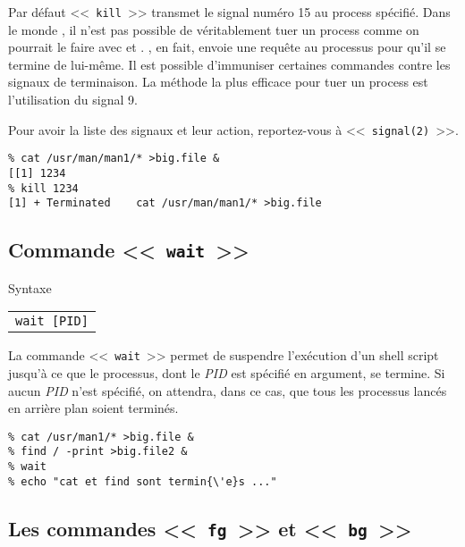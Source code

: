 Par d{\'e}faut <<~{\tt kill}~>> transmet le signal num{\'e}ro 15 au process sp{\'e}cifi{\'e}.
Dans le monde {\Unix}, il n'est pas possible de v{\'e}ritablement tuer un process comme on pourrait le faire avec {\WindowsNT} et {\OpenVMS}. {\Unix}, en fait, envoie une requ{\^e}te au processus pour qu'il se termine de lui-m{\^e}me. Il est possible d'immuniser certaines commandes contre les signaux de terminaison. La
m{\'e}thode la plus efficace pour tuer un process est l'utilisation du signal 9.

Pour avoir la liste des signaux et leur action, reportez-vous {\`a} <<~{\tt signal(2)}~>>.

\begin{example}
\begin{verbatim}
% cat /usr/man/man1/* >big.file &
[[1] 1234
% kill 1234
[1] + Terminated	cat /usr/man/man1/* >big.file
\end{verbatim}
\end{example}

\subsection{Commande <<~{\tt wait}~>>}

\begin{definition}{Syntaxe}
\begin{tabular}{@{\hspace{1cm}}l}
	{\tt wait [PID]}\\[0.2cm]
\end{tabular}
\end{definition}

La commande <<~\texttt{wait}~>> permet de suspendre l'ex{\'e}cution d'un shell script jusqu'{\`a} ce que le processus, dont le \textsl{PID} est sp{\'e}cifi{\'e} en argument, se termine. Si aucun \textsl{PID} n'est sp{\'e}cifi{\'e}, on attendra, dans ce cas, que tous les processus lanc{\'e}s en arri{\`e}re plan soient termin{\'e}s.

\begin{example}
\begin{verbatim}
% cat /usr/man1/* >big.file &
% find / -print >big.file2 &
% wait
% echo "cat et find sont termin{\'e}s ..."
\end{verbatim}
\end{example}

\subsection{\label{multi-task-fg-bg}Les commandes <<~{\tt fg}~>> et <<~{\tt bg}~>>}

